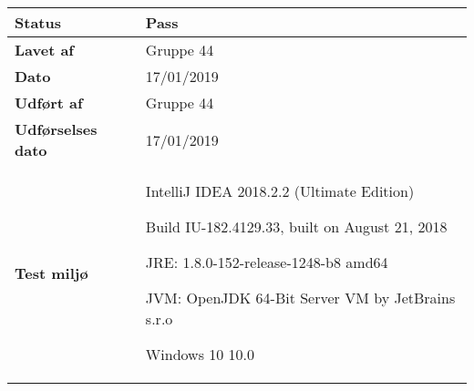 \documentclass[class=article, crop=false]{standalone}
\makeatletter
\let\savespace\@minipagetrue
\makeatother
\begin{document}
\begin{table}[H]
\begin{tabularx}{\textwidth}{|l|X|}
            \textbf{Status} & \textbf{Pass} \\ \hline
            \textbf{Lavet af} & Gruppe 44\\ \hline
            \textbf{Dato} & 17/01/2019 \\ \hline
            \textbf{Udført af } & Gruppe 44\\ \hline
            \textbf{Udførselses dato}  & 17/01/2019\\ \hline
            \textbf{Test miljø}  &  \savespace \begin{compactitem}
                                                   \item IntelliJ IDEA 2018.2.2 (Ultimate Edition)
                                                   \item Build IU-182.4129.33, built on August 21, 2018
                                                   \item JRE: 1.8.0-152-release-1248-b8 amd64
                                                   \item JVM: OpenJDK 64-Bit Server VM by JetBrains s.r.o
                                                   \item Windows 10 10.0
            \end{compactitem} \\ \hline
        \end{tabularx}
    \end{table}
\end{document}
